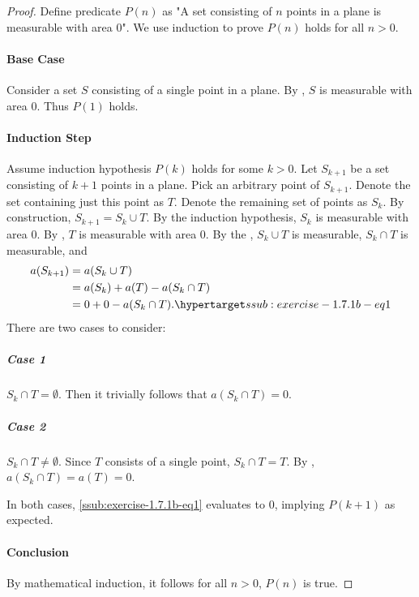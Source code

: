 \documentclass{report}
\begin{document}
  \begin{proof}

    Define predicate $P(n)$ as "A set consisting of $n$ points in a plane is
      measurable with area $0$".
    We use induction to prove $P(n)$ holds for all $n > 0$.

    \paragraph{Base Case}%

      Consider a set $S$ consisting of a single point in a plane.
      By , $S$ is measurable with area $0$.
      Thus $P(1)$ holds.

    \paragraph{Induction Step}%

      Assume induction hypothesis $P(k)$ holds for some $k > 0$.
      Let $S_{k+1}$ be a set consisting of $k + 1$ points in a plane.
      Pick an arbitrary point of $S_{k+1}$.
      Denote the set containing just this point as $T$.
      Denote the remaining set of points as $S_k$.
      By construction, $S_{k+1} = S_k \cup T$.
      By the induction hypothesis, $S_k$ is measurable with area $0$.
      By , $T$ is measurable with area $0$.
      By the , $S_k \cup T$ is
        measurable, $S_k \cap T$ is measurable, and
        \begin{align}
          a(S_{k+1})
            & = a(S_k \cup T) \nonumber \\
            & = a(S_k) + a(T) - a(S_k \cap T) \nonumber \\
            & = 0 + 0 - a(S_k \cap T). \hyperlabel{ssub:exercise-1.7.1b-eq1}
        \end{align}
      There are two cases to consider:

      \subparagraph{Case 1}%

        $S_k \cap T = \emptyset$.
        Then it trivially follows that $a(S_k \cap T) = 0$.

      \subparagraph{Case 2}%

        $S_k \cap T \neq \emptyset$.
        Since $T$ consists of a single point, $S_k \cap T = T$.
        By , $a(S_k \cap T) = a(T) = 0$.

      \vspace{8pt}
      \noindent
      In both cases, \eqref{ssub:exercise-1.7.1b-eq1} evaluates to $0$, implying
        $P(k + 1)$ as expected.

    \paragraph{Conclusion}%

      By mathematical induction, it follows for all $n > 0$, $P(n)$ is true.

  \end{proof}
\end{document}
